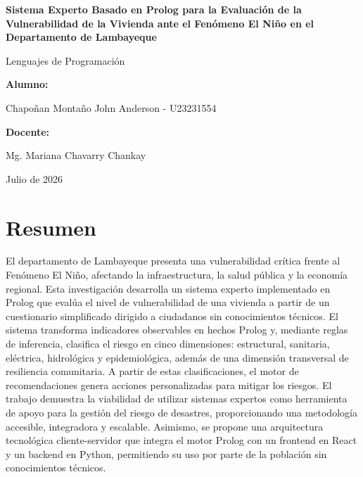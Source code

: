 \documentclass[12pt, letterpaper]{article}
\begin{document}
\begin{titlepage} \thispagestyle{fancy} \fancyfoot{}
    \centering
    \vspace*{2.5cm}
    
    {\Large\bfseries Sistema Experto Basado en Prolog para la Evaluación de la Vulnerabilidad de la Vivienda ante el Fenómeno El Niño en el Departamento de Lambayeque\par}
    
    \vspace{3cm}
    
    {\large Lenguajes de Programación\par}
    
    \vspace{2cm}
    
    {\normalsize\bfseries Alumno:\par}
    {Chapoñan Montaño John Anderson - U23231554\par}
    
    \vspace{2cm}
    
    {\normalsize\bfseries Docente:\par}
    {Mg. Mariana Chavarry Chankay\par}
    
    \vfill
    
    {Julio de 2026\par}
    \vspace{1cm}
    
\end{titlepage}

\newpage
{} %
\section*{\centering\bfseries Resumen}

\noindent El departamento de Lambayeque presenta una vulnerabilidad crítica frente al Fenómeno El Niño, afectando la infraestructura, la salud pública y la economía regional. Esta investigación desarrolla un sistema experto implementado en Prolog que evalúa el nivel de vulnerabilidad de una vivienda a partir de un cuestionario simplificado dirigido a ciudadanos sin conocimientos técnicos. El sistema transforma indicadores observables en hechos Prolog y, mediante reglas de inferencia, clasifica el riesgo en cinco dimensiones: estructural, sanitaria, eléctrica, hidrológica y epidemiológica, además de una dimensión transversal de resiliencia comunitaria. A partir de estas clasificaciones, el motor de recomendaciones genera acciones personalizadas para mitigar los riesgos. El trabajo demuestra la viabilidad de utilizar sistemas expertos como herramienta de apoyo para la gestión del riesgo de desastres, proporcionando una metodología accesible, integradora y escalable. Asimismo, se propone una arquitectura tecnológica cliente-servidor que integra el motor Prolog con un frontend en React y un backend en Python, permitiendo su uso por parte de la población sin conocimientos técnicos.
\end{document}
